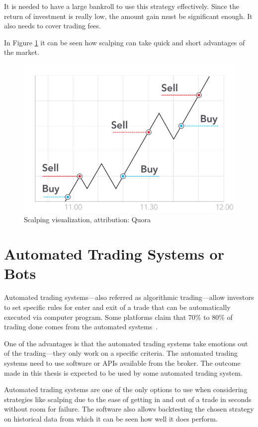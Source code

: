 It is needed to have a large bankroll to use this strategy effectively. Since the return of investment is really low, the amount gain must be significant enough. It also needs to cover trading fees.

In Figure \ref{scalping-figure} it can be seen how scalping can take quick and short advantages of the market.

\begin{figure}[!hbt]
    \centering
    \includegraphics[width=\columnwidth]{figures/scalping.png}
    \caption{Scalping visualization, attribution: Quora~\cite{best-crypto-daytrading}}
    \label{scalping-figure}
\end{figure}

\section{Automated Trading Systems or Bots}
\label{bots}
Automated trading systems---also referred as algorithmic trading---allow investors to set specific rules for enter and exit of a trade that can be automatically executed via computer program. Some platforms claim that 70\% to 80\% of trading done comes from the automated systems~\cite{investopedia-bot-trading}.

One of the advantages is that the automated trading systems take emotions out of the trading---they only work on a specific criteria. The automated trading systems need to use software or APIs available from the broker. The outcome made in this thesis is expected to be used by some automated trading system.

Automated trading systems are one of the only options to use when considering strategies like scalping due to the ease of getting in and out of a trade in seconds without room for failure. The software also allows backtesting the chosen strategy on historical data from which it can be seen how well it does perform.

